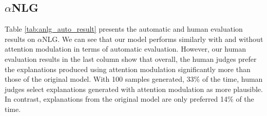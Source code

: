 \documentclass[11pt,a4paper]{article}
\newcommand{\alg}{attention modulation}
\begin{document}
\subsection{$\alpha$NLG}



Table \ref{tab:anlg_auto_result} presents the automatic and human evaluation results on $\alpha$NLG. We can see that our model performs similarly with and without attention modulation in terms of automatic evaluation. However, our human evaluation results in the last column show that overall, the human judges prefer the explanations produced using attention modulation significantly more than those of the original model. With 100 samples generated, 33$\%$ of the time, human judges select explanations generated with \alg{} as more plausible. In contrast, explanations from the original model are only preferred 14$\%$ of the time.
\end{document}

